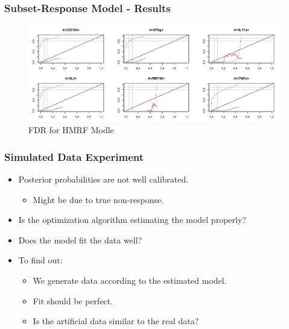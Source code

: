\documentclass{beamer}
\theoremstyle{definition}
\begin{document}

\begin{frame}
\frametitle{Subset-Response Model - Results}
\begin{figure}[]
\includegraphics[width=12 cm]{figures/subsetBinomialFDR} \caption{FDR for HMRF Modle}
\end{figure}
\end{frame}


\begin{frame}
\frametitle{Simulated Data Experiment}
\begin{itemize}
\item Posterior probabilities are not well calibrated.
	\begin{itemize}
	\item Might be due to true non-response.
	\end{itemize}
\pause
\vspace{0.5 cm}
\item Is the optimization algorithm estimating the model properly?
\vspace{0.5 cm}
\item Does the model fit the data well? 

\pause
\vspace{0.5 cm}
\item To find out:
	\begin{itemize}
	\item We generate data according to the estimated model.
	\item Fit should be perfect. 
	\item Is the artificial data similar to the real data?
	\end{itemize} 
\end{itemize}
\end{frame}

\end{document}

